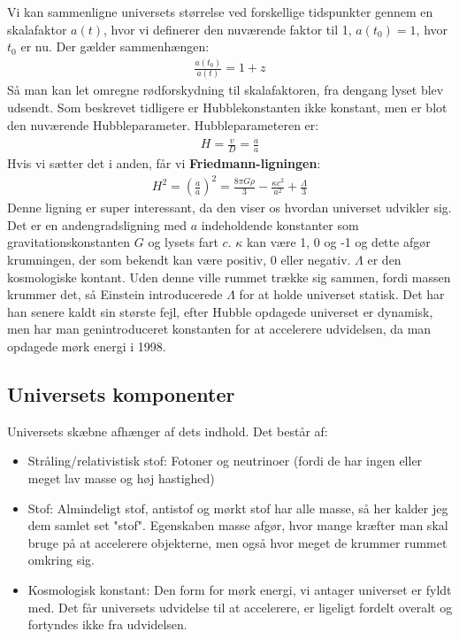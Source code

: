 Vi kan sammenligne universets størrelse ved forskellige tidspunkter gennem en skalafaktor $a(t)$, hvor vi definerer den nuværende faktor til 1, $a(t_0)=1$, hvor $t_0$ er nu. Der gælder sammenhængen:
\begin{align}
	\frac{a(t_0)}{a(t)}=1+z
\end{align}
Så man kan let omregne rødforskydning til skalafaktoren, fra dengang lyset blev udsendt. Som beskrevet%
 tidligere er Hubblekonstanten ikke konstant, men er blot den nuværende Hubbleparameter. Hubbleparameteren er:
 \begin{align}
 H=\frac{v}{D}=\frac{\dot{a}}{a}
 \end{align}
 Hvis vi sætter det i anden, får vi \textbf{Friedmann-ligningen}:
\begin{align}
	H^2=\left(\frac{\dot{a}}{a}\right)^2=\frac{8\pi G \rho}{3}-\frac{\kappa c^2}{a^2}+\frac{\Lambda}{3}
\end{align}
Denne ligning er super interessant, da den viser os hvordan universet udvikler sig. Det er en andengradsligning med $a$ indeholdende konstanter som gravitationskonstanten $G$ og lysets fart $c$. $\kappa$ kan være 1, 0 og -1 og dette afgør krumningen, der som bekendt kan være positiv, 0 eller negativ. $\Lambda$ er den kosmologiske kontant. Uden denne ville rummet trække sig sammen, fordi massen krummer det, så Einstein introducerede $\Lambda$ for at holde universet statisk. Det har han senere kaldt sin største fejl, efter Hubble opdagede universet er dynamisk, men har man genintroduceret konstanten for at accelerere udvidelsen, da man opdagede mørk energi i 1998. 


\subsection{Universets komponenter} \label{bestanddele}
Universets skæbne afhænger af dets indhold. Det består af:
\begin{itemize}
	\item Stråling/relativistisk stof: Fotoner og neutrinoer (fordi de har ingen eller meget lav masse og høj hastighed)
	\item Stof: Almindeligt stof, antistof og mørkt stof har alle masse, så her kalder jeg dem samlet set "stof". Egenskaben masse afgør, hvor mange kræfter man skal bruge på at accelerere objekterne, men også hvor meget de krummer rummet omkring sig.
	\item Kosmologisk konstant: Den form for mørk energi, vi antager universet er fyldt med. Det får universets udvidelse til at accelerere, er ligeligt fordelt overalt og fortyndes ikke fra udvidelsen.
\end{itemize}

